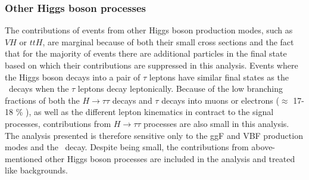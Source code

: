 \subsubsection{Other Higgs boson processes}
The contributions of \HWW events from other Higgs boson production modes, such as $VH$ or $ttH$, are marginal because of both their small cross sections and the fact that for the majority of events there are additional particles in the final state based on which their contributions are suppressed in this analysis.
Events where the Higgs boson decays into a pair of $\tau$ leptons have similar final states as the \HWWdet\ decays when the $\tau$ leptons decay leptonically. 
Because of the low branching fractions of both the $H \to \tau\tau$ decays and $\tau$ decays into muons or electrons ($\approx$ 17-18 \% \cite{PDG2020}), as well as the different lepton kinematics in contract to the signal processes, contributions from $H \to \tau\tau$ processes are also small in this analysis. 
The analysis presented is therefore sensitive only to the ggF and VBF production modes and the \HWWdet\ decay. 
Despite being small, the contributions from above-mentioned other Higgs boson processes are included in the analysis and treated like backgrounds.

